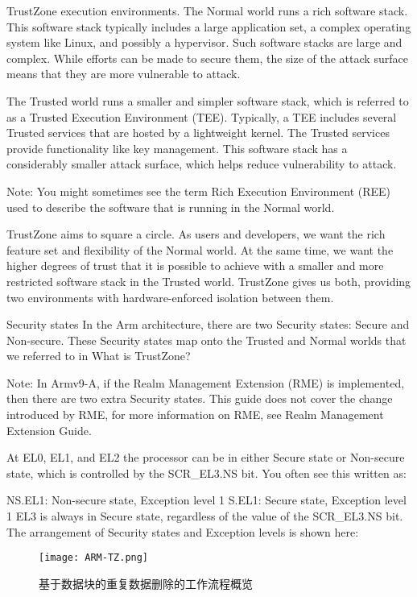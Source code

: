 TrustZone execution environments.
The Normal world runs a rich software stack. This software stack typically includes a large application set, a complex operating system like Linux, and possibly a hypervisor. Such software stacks are large and complex. While efforts can be made to secure them, the size of the attack surface means that they are more vulnerable to attack.

The Trusted world runs a smaller and simpler software stack, which is referred to as a Trusted Execution Environment (TEE). Typically, a TEE includes several Trusted services that are hosted by a lightweight kernel. The Trusted services provide functionality like key management. This software stack has a considerably smaller attack surface, which helps reduce vulnerability to attack.

Note: You might sometimes see the term Rich Execution Environment (REE) used to describe the software that is running in the Normal world.

TrustZone aims to square a circle. As users and developers, we want the rich feature set and flexibility of the Normal world. At the same time, we want the higher degrees of trust that it is possible to achieve with a smaller and more restricted software stack in the Trusted world. TrustZone gives us both, providing two environments with hardware-enforced isolation between them.


Security states
In the Arm architecture, there are two Security states: Secure and Non-secure. These Security states map onto the Trusted and Normal worlds that we referred to in What is TrustZone?

Note: In Armv9-A, if the Realm Management Extension (RME) is implemented, then there are two extra Security states. This guide does not cover the change introduced by RME, for more information on RME, see Realm Management Extension Guide.

At EL0, EL1, and EL2 the processor can be in either Secure state or Non-secure state, which is controlled by the SCR\_EL3.NS bit. You often see this written as:

NS.EL1: Non-secure state, Exception level 1
S.EL1: Secure state, Exception level 1
EL3 is always in Secure state, regardless of the value of the SCR\_EL3.NS bit. The arrangement of Security states and Exception levels is shown here:

\begin{figure}[!htb]
    \small
    \centering
    \texttt{[image: ARM-TZ.png]}
    \caption{基于数据块的重复数据删除的工作流程概览} 
    \label{fig:重复数据删除的工作流程概览}
\end{figure}

